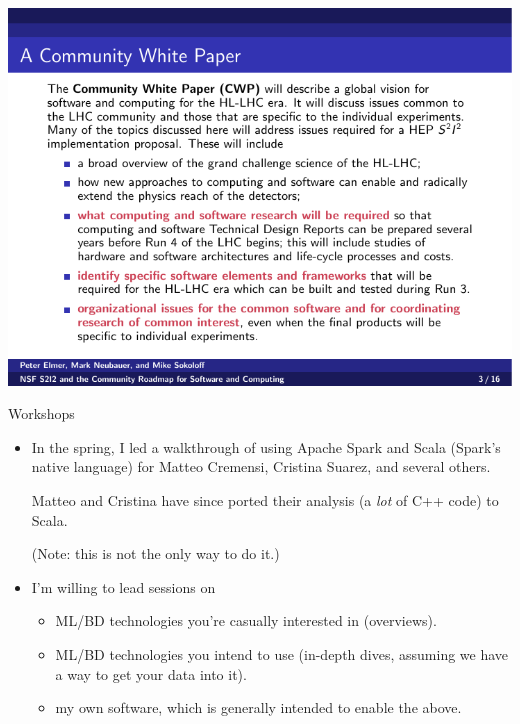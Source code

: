 \documentclass{beamer}
\begin{document}
\begin{frame}{}
\vspace{-0.15 cm}
\mbox{\hspace{-1 cm}\includegraphics[width=1.2\linewidth]{whitepaper.png}}
\end{frame}

\begin{frame}{Workshops}
\vspace{0.5 cm}
\begin{itemize}\setlength{\itemsep}{0.75 cm}
\item In the spring, I led a walkthrough of using Apache Spark and Scala (Spark's native language) for Matteo Cremensi, Cristina Suarez, and several others.

\vspace{0.25 cm}
Matteo and Cristina have since ported their analysis (a {\it lot} of C++ code) to Scala.

\vspace{0.25 cm}
(Note: this is not the only way to do it.)

\item I'm willing to lead sessions on
\begin{itemize}
\item ML/BD technologies you're casually interested in (overviews).
\item ML/BD technologies you intend to use (in-depth dives, assuming we have a way to get your data into it).
\item my own software, which is generally intended to enable the above.
\end{itemize}
\end{itemize}
\end{frame}
\end{document}
